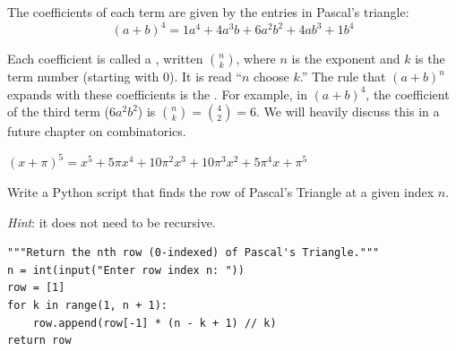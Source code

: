 The coefficients of each term are given by the entries in Pascal's triangle:
\begin{equation*}
(a + b)^4 = 1a^4 + 4a^3b + 6a^2 b^2 + 4 a b^3 + 1 b^4   
\end{equation*}

Each coefficient is called a , written $\binom{n}{k}$, where $n$ is the exponent and $k$ is
the term number (starting with 0). It is read ``$n$ choose $k$.'' The rule
that $(a+b)^n$ expands with these coefficients is the .  For example, in $(a + b)^4$, the coefficient of the third term 
($6a^2b^2$) is $\binom{n}{k}=\binom{4}{2} = 6$. We will heavily discuss this in a future chapter on combinatorics.

\begin{Exercise}[title={Using Pascal's Triangle}, label=pascalbinomial]
\end{Exercise}
\begin{Answer}[ref=pascalbinomial]
  $(x + \pi)^5 = x^5 + 5\pi x^4 + 10\pi^2 x^3 + 10\pi^3 x^2 + 5\pi^4 x + \pi^5$
\end{Answer}

\begin{Exercise}[title={Coding Pascal's Triangle}, label={ex:pascalrow}]

Write a Python script that finds the row of Pascal's Triangle at a given index $n$. 

\textit{Hint}: it does not need to be recursive.

\end{Exercise}

\begin{Answer}[ref={ex:pascalrow}]

\begin{verbatim}
"""Return the nth row (0-indexed) of Pascal's Triangle."""
n = int(input("Enter row index n: "))
row = [1]
for k in range(1, n + 1):
    row.append(row[-1] * (n - k + 1) // k)
return row
\end{verbatim}

\end{Answer}
